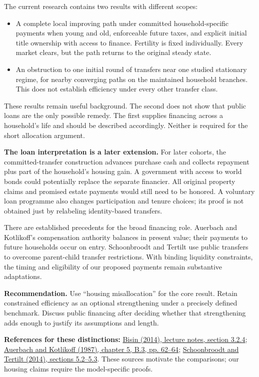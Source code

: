 \documentclass[11pt]{article}
\begin{document}
The current research contains two results with different scopes:
\begin{itemize}
\item A complete local improving path under committed household-specific
  payments when young and old, enforceable future taxes, and explicit initial
  title ownership with access to finance. Fertility is fixed individually.
  Every market clears, but the path returns to the original steady state.
\item An obstruction to one initial round of transfers near one studied
  stationary regime, for nearby converging paths on the maintained household
  branches. This does not establish efficiency under every other transfer class.
\end{itemize}

These results remain useful background. The second does not show that public
loans are the only possible remedy. The first supplies financing across a
household's life and should be described accordingly. Neither is required
for the short allocation argument.

\textbf{The loan interpretation is a later extension.} For later cohorts,
the committed-transfer construction advances purchase cash and collects
repayment plus part of the household's housing gain. A government with access
to world bonds could potentially replace the separate financier. All original
property claims and promised estate payments would still need to be honored.
A voluntary loan programme also changes participation and tenure choices;
its proof is not obtained just by relabeling identity-based transfers.

There are established precedents for the broad financing role. Auerbach and
Kotlikoff's compensation authority balances in present value; their payments
to future households occur on entry. Schoonbroodt and Tertilt use public
transfers to overcome parent-child transfer restrictions. With binding
liquidity constraints, the timing and eligibility of our proposed payments
remain substantive adaptations.

\textbf{Recommendation.} Use ``housing misallocation'' for the core result.
Retain constrained efficiency as an optional strengthening under a precisely
defined benchmark. Discuss public financing after deciding whether that
strengthening adds enough to justify its assumptions and length.

{\small
\textbf{References for these distinctions:}
\href{https://bpb-us-e1.wpmucdn.com/wp.nyu.edu/dist/c/16384/files/2019/11/Lecture-notes-Oct2014.pdf}{Bisin (2014), lecture notes, section 3.2.4};
\href{https://kotlikoff.net/wp-content/uploads/2019/04/Dynamic-Fiscal-Policy.pdf}{Auerbach and Kotlikoff (1987), chapter 5, B.3, pp. 62--64};
\href{https://tertilt.vwl.uni-mannheim.de/research/JET2013.pdf}{Schoonbroodt and Tertilt (2014), sections 5.2--5.3}.
These sources motivate the comparisons; our housing claims require the
model-specific proofs.}
\end{document}
